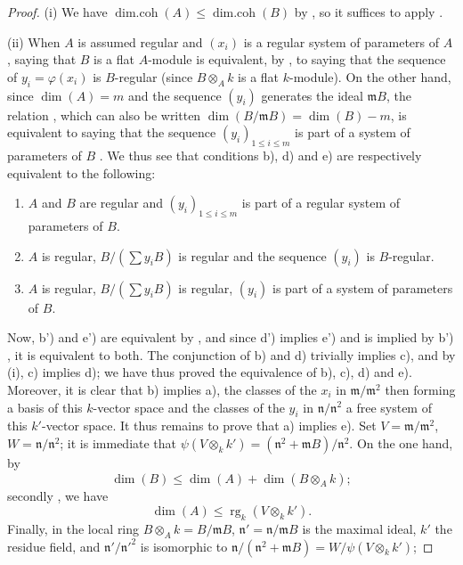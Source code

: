 \begin{proof}
(i) We have $\operatorname{dim.coh}(A)\leq\operatorname{dim.coh}(B)$ by , so it suffices to apply .

(ii) When $A$ is assumed regular and $(x_i)$ is a regular system of parameters of $A$, saying that $B$ is a flat $A$-module is equivalent, by , to saying that the sequence of $y_i=\varphi(x_i)$ is $B$-regular (since $B\otimes_A k$ is a flat $k$-module).
On the other hand, since $\dim(A)=m$ and the sequence $(y_i)$ generates the ideal $\mathfrak{m}B$, the relation , which can also be written $\dim(B/\mathfrak{m}B)=\dim(B)-m$, is equivalent to saying that the sequence $(y_i)_{1\leq i\leq m}$ is part of a system of parameters of $B$ .
We thus see that conditions b), d) and e) are respectively equivalent to the following:
\begin{enumerate}
  \item[{\rm b')}] $A$ and $B$ are regular and $(y_i)_{1\leq i\leq m}$ is part of a regular system of parameters of $B$.
  \item[{\rm d')}] $A$ is regular, $B/(\sum y_i B)$ is regular and the sequence $(y_i)$ is $B$-regular.
  \item[{\rm e')}] $A$ is regular, $B/(\sum y_i B)$ is regular, $(y_i)$ is part of a system of parameters of $B$.
\end{enumerate}
Now, b') and e') are equivalent by , and since d') implies e') and is implied by b') , it is equivalent to both.
The conjunction of b) and d) trivially implies c), and by (i), c) implies d);
we have thus proved the equivalence of b), c), d) and e).
Moreover, it is clear that b) implies a), the classes of the $x_i$ in $\mathfrak{m}/\mathfrak{m}^2$ then forming a basis of this $k$-vector space and the classes of the $y_i$ in $\mathfrak{n}/\mathfrak{n}^2$ a free system of this $k'$-vector space.
It thus remains to prove that a) implies e).
Set $V=\mathfrak{m}/\mathfrak{m}^2$, $W=\mathfrak{n}/\mathfrak{n}^2$;
it is immediate that $\psi(V\otimes_k k')=(\mathfrak{n}^2+\mathfrak{m}B)/\mathfrak{n}^2$.
On the one hand, by 
\[
\label{0.17.3.3.3}
  \dim(B)\leq\dim(A)+\dim(B\otimes_A k);
  \tag{17.3.3.3}
\]
secondly , we have
\[
\label{0.17.3.3.4}
  \dim(A)\leq\operatorname{rg}_k(V\otimes_k k').
  \tag{17.3.3.4}
\]
Finally, in the local ring $B\otimes_A k=B/\mathfrak{m}B$, $\mathfrak{n}'=\mathfrak{n}/\mathfrak{m}B$ is the maximal ideal, $k'$ the residue field, and $\mathfrak{n}'/\mathfrak{n}'^2$ is isomorphic to $\mathfrak{n}/(\mathfrak{n}^2+\mathfrak{m}B)=W/\psi(V\otimes_k k')$;

\end{proof}
